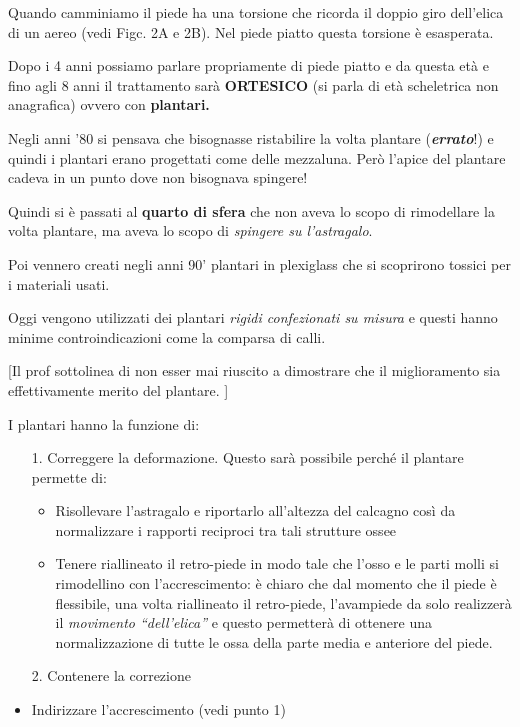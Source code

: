 Quando camminiamo il piede ha una torsione che ricorda il doppio giro dell'elica di un aereo (vedi Figc. 2A e 2B). Nel piede piatto questa torsione è esasperata.

Dopo i 4 anni possiamo parlare propriamente di piede piatto e da questa età e fino agli 8 anni il trattamento sarà \textbf{ORTESICO} (si parla di età scheletrica non anagrafica) ovvero con \textbf{plantari.}

Negli anni '80 si pensava che bisognasse ristabilire la volta plantare (\textbf{\emph{errato}}!) e quindi i plantari erano progettati come delle mezzaluna. Però l'apice del plantare cadeva in un punto dove non bisognava spingere!

Quindi si è passati al \textbf{quarto di sfera} che non aveva lo scopo di rimodellare la volta plantare, ma aveva lo scopo di \emph{spingere su l'astragalo}.

Poi vennero creati negli anni 90' plantari in plexiglass che si scoprirono tossici per i materiali usati.

Oggi vengono utilizzati dei plantari \emph{rigidi confezionati su misura} e questi hanno minime controindicazioni come la comparsa di calli.

{[}Il prof sottolinea di non esser mai riuscito a dimostrare che il miglioramento sia effettivamente merito del plantare. {]}

I plantari hanno la funzione di:

\begin{itemize}
\item[1.]
  Correggere la deformazione. Questo sarà possibile perché il plantare permette di:
\begin{itemize}
\item
  Risollevare l'astragalo e riportarlo all'altezza del calcagno così da normalizzare i rapporti reciproci tra tali strutture ossee
\item
  Tenere riallineato il retro-piede in modo tale che l'osso e le parti molli si rimodellino con l'accrescimento: è chiaro che dal momento che il piede è flessibile, una volta riallineato il retro-piede, l'avampiede da solo realizzerà il \emph{movimento ``dell'elica''} e questo permetterà di ottenere una normalizzazione di tutte le ossa della parte media e anteriore del piede.
\end{itemize}
\item[2.]
  Contenere la correzione
\item
  Indirizzare l'accrescimento (vedi punto 1)
\end{itemize}

